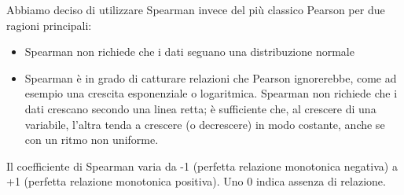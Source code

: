 Abbiamo deciso di utilizzare Spearman invece del più classico Pearson per due ragioni principali:
\begin{itemize}
    \item Spearman non richiede che i dati seguano una distribuzione normale
    \item Spearman è in grado di catturare relazioni che Pearson ignorerebbe, come ad esempio una crescita esponenziale o logaritmica. Spearman non richiede che i dati crescano secondo una linea retta; è sufficiente che, al crescere di una variabile, l'altra tenda a crescere (o decrescere) in modo costante, anche se con un ritmo non uniforme.
\end{itemize}

Il coefficiente di Spearman varia da -1 (perfetta relazione monotonica negativa) a +1 (perfetta relazione monotonica positiva). Uno 0 indica assenza di relazione.
